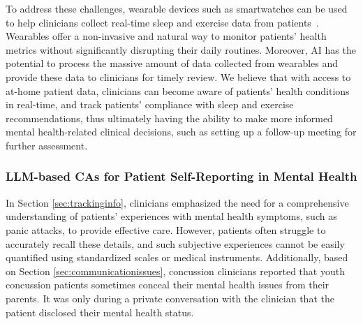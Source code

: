 To address these challenges, wearable devices such as smartwatches can be used to help clinicians collect real-time sleep and exercise data from patients~\cite{dias2018wearable, baig2017systematic, bate2023role}. 
Wearables offer a non-invasive and natural way to monitor patients’ health metrics without significantly disrupting their daily routines. 
Moreover, AI has the potential to process the massive amount of data collected from wearables and provide these data to clinicians for timely review.
We believe that with access to at-home patient data, clinicians can become aware of patients' health conditions in real-time, and track patients' compliance with sleep and exercise recommendations, thus ultimately having the ability to make more informed mental health-related clinical decisions, such as setting up a follow-up meeting for further assessment.


\subsubsection{LLM-based CAs for Patient Self-Reporting in Mental Health}
\label{sec:casforselfreport}

In Section \ref{sec:trackinginfo}, clinicians emphasized the need for a comprehensive understanding of patients' experiences with mental health symptoms, such as panic attacks, to provide effective care. However, patients often struggle to accurately recall these details, and such subjective experiences cannot be easily quantified using standardized scales or medical instruments. Additionally, based on Section \ref{sec:communicationissues}, concussion clinicians reported that youth concussion patients sometimes conceal their mental health issues from their parents. It was only during a private conversation with the clinician that the patient disclosed their mental health status.

